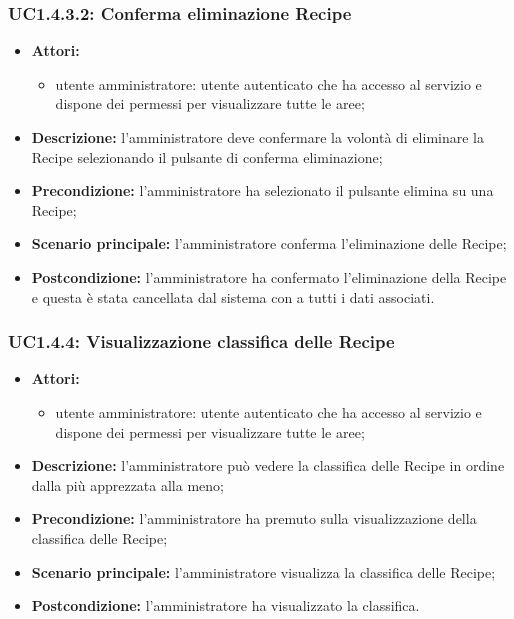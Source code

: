 \subsubsection{UC1.4.3.2: Conferma eliminazione Recipe}
\begin{itemize}
	\item \textbf{Attori:}
	\begin{itemize}
		\item utente amministratore: utente autenticato che ha accesso al servizio e dispone dei permessi per visualizzare tutte le aree;
	\end{itemize}
	\item \textbf{Descrizione:} l'amministratore deve confermare la volontà di eliminare la Recipe selezionando il pulsante di conferma eliminazione;
	\item \textbf{Precondizione:} l'amministratore ha selezionato il pulsante elimina su una Recipe;
	\item \textbf{Scenario principale:} l'amministratore conferma l'eliminazione delle Recipe;
	\item \textbf{Postcondizione:} l'amministratore ha confermato l'eliminazione della Recipe e questa è stata cancellata dal sistema con a tutti i dati associati.
\end{itemize}

\subsubsection{UC1.4.4: Visualizzazione classifica delle Recipe}
\begin{itemize}
	\item \textbf{Attori:}
	\begin{itemize}
		\item utente amministratore: utente autenticato che ha accesso al servizio e dispone dei permessi per visualizzare tutte le aree;
	\end{itemize}
	\item \textbf{Descrizione:} l'amministratore può vedere la classifica delle Recipe in ordine dalla più apprezzata alla meno;
	\item \textbf{Precondizione:} l'amministratore ha premuto sulla visualizzazione della classifica delle Recipe;
	\item \textbf{Scenario principale:} l'amministratore visualizza la classifica delle Recipe;
	\item \textbf{Postcondizione:} l'amministratore ha visualizzato la classifica.
\end{itemize}


